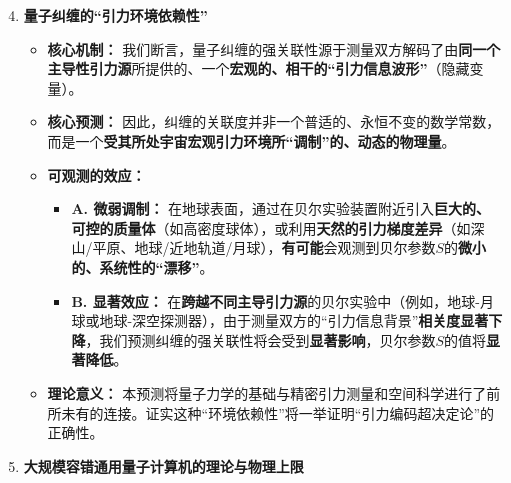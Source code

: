 \documentclass[11pt, a4paper]{article}
\begin{document}
\begin{enumerate}
    \setcounter{enumi}{3} %
    \item \textbf{量子纠缠的“引力环境依赖性”} \cite{Bell1964}

    \begin{itemize}
        \item \textbf{核心机制：} 我们断言，量子纠缠的强关联性源于测量双方解码了由\textbf{同一个主导性引力源}所提供的、一个\textbf{宏观的、相干的“引力信息波形”}（隐藏变量）。
        \item \textbf{核心预测：} 因此，纠缠的关联度并非一个普适的、永恒不变的数学常数，而是一个\textbf{受其所处宇宙宏观引力环境所“调制”的、动态的物理量}。
        \item \textbf{可观测的效应：}
        \begin{itemize}
            \item \textbf{A. 微弱调制：} 在地球表面，通过在贝尔实验装置附近引入\textbf{巨大的、可控的质量体}（如高密度球体），或利用\textbf{天然的引力梯度差异}（如深山/平原、地球/近地轨道/月球），\textbf{有可能}会观测到贝尔参数$S$的\textbf{微小的、系统性的“漂移”}。
            \item \textbf{B. 显著效应：} 在\textbf{跨越不同主导引力源}的贝尔实验中（例如，地球-月球或地球-深空探测器），由于测量双方的“引力信息背景”\textbf{相关度显著下降}，我们预测纠缠的强关联性将会受到\textbf{显著影响}，贝尔参数$S$的值将\textbf{显著降低}。
        \end{itemize}
        \item \textbf{理论意义：} 本预测将量子力学的基础与精密引力测量和空间科学进行了前所未有的连接。证实这种“环境依赖性”将一举证明“引力编码超决定论”的正确性。
    \end{itemize}

    \item \textbf{大规模容错通用量子计算机的理论与物理上限}


\end{enumerate}
\end{document}
